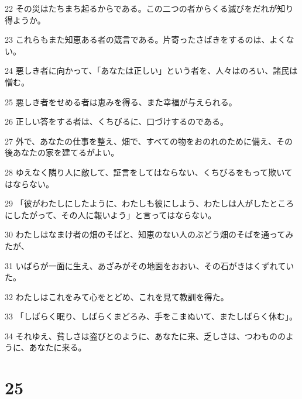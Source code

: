 \par 22 その災はたちまち起るからである。この二つの者からくる滅びをだれが知り得ようか。
\par 23 これらもまた知恵ある者の箴言である。片寄ったさばきをするのは、よくない。
\par 24 悪しき者に向かって、「あなたは正しい」という者を、人々はのろい、諸民は憎む。
\par 25 悪しき者をせめる者は恵みを得る、また幸福が与えられる。
\par 26 正しい答をする者は、くちびるに、口づけするのである。
\par 27 外で、あなたの仕事を整え、畑で、すべての物をおのれのために備え、その後あなたの家を建てるがよい。
\par 28 ゆえなく隣り人に敵して、証言をしてはならない、くちびるをもって欺いてはならない。
\par 29 「彼がわたしにしたように、わたしも彼にしよう、わたしは人がしたところにしたがって、その人に報いよう」と言ってはならない。
\par 30 わたしはなまけ者の畑のそばと、知恵のない人のぶどう畑のそばを通ってみたが、
\par 31 いばらが一面に生え、あざみがその地面をおおい、その石がきはくずれていた。
\par 32 わたしはこれをみて心をとどめ、これを見て教訓を得た。
\par 33 「しばらく眠り、しばらくまどろみ、手をこまぬいて、またしばらく休む」。
\par 34 それゆえ、貧しさは盗びとのように、あなたに来、乏しさは、つわもののように、あなたに来る。

\chapter{25}

